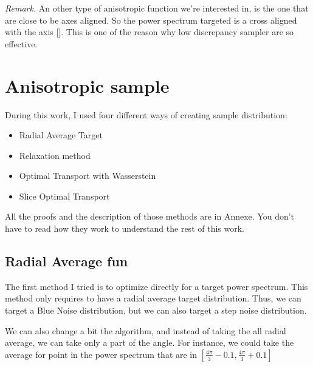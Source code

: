 \documentclass{classeENS}
\begin{document}
\> \textit{Remark.} An other type of anisotropic function we're interested in, 
    is the one that are close to be axes aligned. So the power spectrum 
    targeted is a cross aligned with the axis [\cite{singh17convergence}]. 
    This is one of the reason why 
    low discrepancy sampler are so effective.

\section{Anisotropic sample}

During this work, I used four different ways of creating sample distribution:
\begin{itemize}
    \item Radial Average Target
    \item Relaxation method
    \item Optimal Transport with Wasserstein
    \item Slice Optimal Transport 
\end{itemize}
All the proofs and the description of those methods are in Annexe. 
You don't have to read how they work to understand the rest of this work.

\subsection{Radial Average fun}
    The first method I tried is to optimize directly for a target power spectrum.
    This method only requires to have a radial average target distribution. Thus, we can
    target a Blue Noise distribution, but we can also target a step noise distribution.
    
    We can also change a bit the algorithm, and instead of taking the all radial average,
    we can take only a part of the angle. For instance, we could take the average for
    point in the power spectrum that are in $[\frac{4\pi}{3} - 0.1, \frac{4\pi}{3}+0.1]$
    
\end{document}
